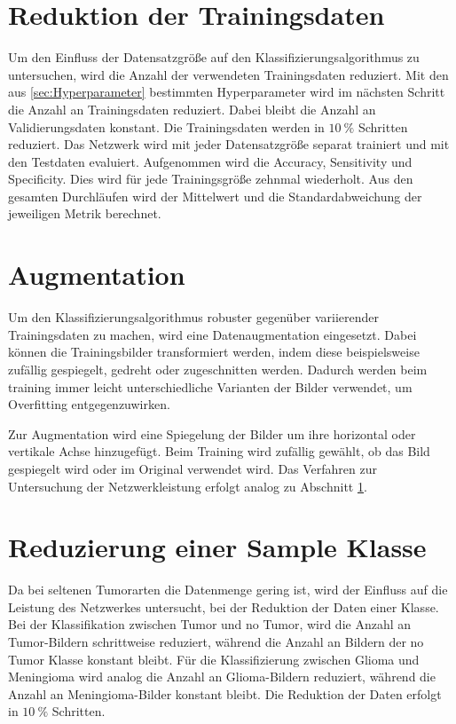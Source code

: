 \section{Reduktion der Trainingsdaten}\label{sec:Red1}
Um den Einfluss der Datensatzgröße auf den Klassifizierungsalgorithmus zu untersuchen, wird die Anzahl der verwendeten Trainingsdaten reduziert.
Mit den aus \ref{sec:Hyperparameter} bestimmten Hyperparameter wird im nächsten Schritt die Anzahl an Trainingsdaten reduziert.
Dabei bleibt die Anzahl an Validierungsdaten konstant.
Die Trainingsdaten werden in $\qty{10}{\%}$ Schritten reduziert. 
Das Netzwerk wird mit jeder Datensatzgröße separat trainiert und mit den Testdaten evaluiert. 
Aufgenommen wird die Accuracy, Sensitivity und Specificity.
Dies wird für jede Trainingsgröße zehnmal wiederholt.
Aus den gesamten Durchläufen wird der Mittelwert und die Standardabweichung der jeweiligen Metrik berechnet.

\section{Augmentation}
Um den Klassifizierungsalgorithmus robuster gegenüber variierender Trainingsdaten zu machen, wird eine Datenaugmentation eingesetzt.
Dabei können die Trainingsbilder transformiert werden, indem diese beispielsweise zufällig gespiegelt, gedreht oder zugeschnitten werden. 
Dadurch werden beim training immer leicht unterschiedliche Varianten der Bilder verwendet, um Overfitting entgegenzuwirken.~\cite{Yamashita2018}

Zur Augmentation wird eine Spiegelung der Bilder um ihre horizontal oder vertikale Achse hinzugefügt.
Beim Training wird zufällig gewählt, ob das Bild gespiegelt wird oder im Original verwendet wird.
Das Verfahren zur Untersuchung der Netzwerkleistung erfolgt analog zu Abschnitt \ref{sec:Red1}.    

\section{Reduzierung einer Sample Klasse}
Da bei seltenen Tumorarten die Datenmenge gering ist, wird der Einfluss auf die Leistung des Netzwerkes untersucht, 
bei der Reduktion der Daten einer Klasse.
Bei der Klassifikation zwischen Tumor und no Tumor, wird die Anzahl an Tumor-Bildern schrittweise reduziert, 
während die Anzahl an Bildern der no Tumor Klasse konstant bleibt.
Für die Klassifizierung zwischen Glioma und Meningioma wird analog die Anzahl an Glioma-Bildern reduziert, während die Anzahl an Meningioma-Bilder konstant bleibt.
Die Reduktion der Daten erfolgt in $\qty{10}{\%}$ Schritten. 

